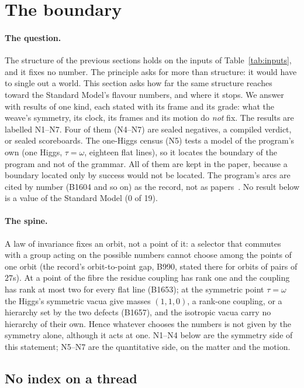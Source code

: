 \section{The boundary}\label{sec:boundary}

\paragraph{The question.}
The structure of the previous sections holds on the inputs of Table~\ref{tab:inputs}, and it fixes no number. The principle asks for more than structure: it would have to single
out a world. This section asks how far the same structure reaches toward the Standard Model's flavour numbers, and
where it stops. We answer with results of one kind, each stated with its frame and its grade: what the weave's
symmetry, its clock, its frames and its motion do \emph{not} fix. The results are labelled N1--N7. Four of them (N4--N7) are sealed negatives, a compiled verdict, or sealed
scoreboards. The one-Higgs census (N5) tests a model of the program's own (one Higgs, $\tau=\omega$, eighteen flat lines),
so it locates the boundary of the program and not of the grammar. All of them are kept in the paper, because a boundary located only by success would not be located. The
program's arcs are cited by number (B1604 and so on) as the record, not as papers~\cite{OriginAxiomRepo}. No result
below is a value of the Standard Model (0 of 19).

\paragraph{The spine.}
A law of invariance fixes an orbit, not a point of it: a selector that commutes with a group acting on the possible
numbers cannot choose among the points of one orbit (the record's orbit-to-point gap, B990, stated there for orbits of
pairs of $27$s).
At a point of the fibre the residue coupling has rank one and the coupling has rank at most two for every flat line
(B1653); at the symmetric point $\tau=\omega$ the Higgs's symmetric vacua give masses $(1,1,0)$, a rank-one coupling, or a
hierarchy set by the two defects (B1657), and the isotropic vacua carry no hierarchy of their own. Hence whatever chooses the numbers is not given by the
symmetry alone, although it acts at one. N1--N4 below are the symmetry side of this statement; N5--N7 are the
quantitative side, on the matter and the motion.

\subsection{No index on a thread}

